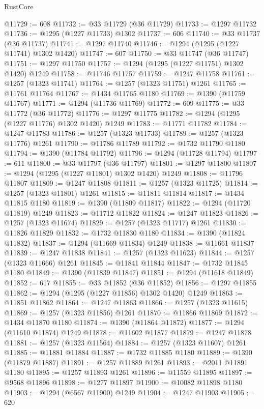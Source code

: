\begin{lexlean}{RustCore}
\begin{coremodule}
@11729 := 608
@11732 := @33 @11729 (@36 @11729)
@11733 := @1297 @11732
@11736 := @1295 (@1227 @11733) @1302
@11737 := 606
@11740 := @33 @11737 (@36 @11737)
@11741 := @1297 @11740
@11746 := @1294 (@1295 (@1227 @11741) @1302 @1420)
@11747 := 607
@11750 := @33 @11747 (@36 @11747)
@11751 := @1297 @11750
@11757 := @1294 (@1295 (@1227 @11751) @1302 @1420) @1249
@11758 := @11746 @11757
@11759 := @1247 @11758
@11761 := @1257 (@1323 @11741)
@11764 := @1257 (@1323 @11751) @1261
@11765 := @11761 @11764
@11767 := @1434 @11765 @1180
@11769 := @1390 (@11759 @11767)
@11771 := @1294 (@11736 @11769)
@11772 := 609
@11775 := @33 @11772 (@36 @11772)
@11776 := @1297 @11775
@11782 := @1294 (@1295 (@1227 @11776) @1302 @1420) @1249
@11783 := @11771 @11782
@11784 := @1247 @11783
@11786 := @1257 (@1323 @11733)
@11789 := @1257 (@1323 @11776) @1261
@11790 := @11786 @11789
@11792 := @1732 @11790 @1180
@11794 := @1390 (@11784 @11792)
@11796 := @1294 (@11728 @11794)
@11797 := 611
@11800 := @33 @11797 (@36 @11797)
@11801 := @1297 @11800
@11807 := @1294 (@1295 (@1227 @11801) @1302 @1420) @1249
@11808 := @11796 @11807
@11809 := @1247 @11808
@11811 := @1257 (@1323 @11725)
@11814 := @1257 (@1323 @11801) @1261
@11815 := @11811 @11814
@11817 := @1434 @11815 @1180
@11819 := @1390 (@11809 @11817)
@11822 := @1294 (@11720 @11819) @1249
@11823 := @11712 @11822
@11824 := @1247 @11823
@11826 := @1257 (@1323 @11674)
@11829 := @1257 (@1323 @11717) @1261
@11830 := @11826 @11829
@11832 := @1732 @11830 @1180
@11834 := @1390 (@11824 @11832)
@11837 := @1294 (@11669 @11834) @1249
@11838 := @11661 @11837
@11839 := @1247 @11838
@11841 := @1257 (@1323 @11623)
@11844 := @1257 (@1323 @11666) @1261
@11845 := @11841 @11844
@11847 := @1732 @11845 @1180
@11849 := @1390 (@11839 @11847)
@11851 := @1294 (@11618 @11849)
@11852 := 617
@11855 := @33 @11852 (@36 @11852)
@11856 := @1297 @11855
@11862 := @1294 (@1295 (@1227 @11856) @1302 @1420) @1249
@11863 := @11851 @11862
@11864 := @1247 @11863
@11866 := @1257 (@1323 @11615)
@11869 := @1257 (@1323 @11856) @1261
@11870 := @11866 @11869
@11872 := @1434 @11870 @1180
@11874 := @1390 (@11864 @11872)
@11877 := @1294 (@11610 @11874) @1249
@11878 := @11602 @11877
@11879 := @1247 @11878
@11881 := @1257 (@1323 @11564)
@11884 := @1257 (@1323 @11607) @1261
@11885 := @11881 @11884
@11887 := @1732 @11885 @1180
@11889 := @1390 (@11879 @11887)
@11891 := @1257 @11889 @1261
@11893 := @2011 @11891 @1180
@11895 := @1257 @11893 @1261
@11896 := @11559 @11895
@11897 := @9568 @11896
@11898 := @1277 @11897
@11900 := @10082 @11898 @1180
@11903 := @1294 (@6567 @11900) @1249
@11904 := @1247 @11903
@11905 := 620

\end{coremodule}
\end{lexlean}
